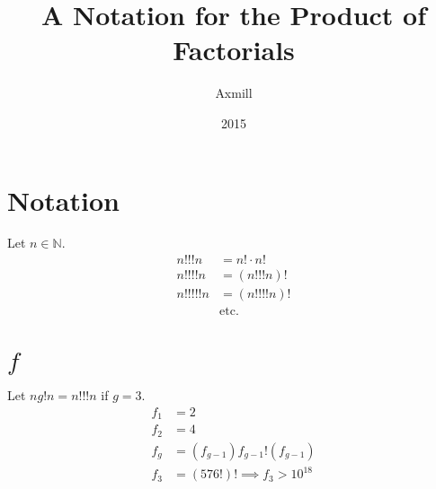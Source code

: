 \documentclass{article}
\title{A Notation for the Product of Factorials}
\author{Axmill}
\date{2015}
\begin{document}
	\maketitle
	\section{Notation}
	Let $n \in \mathbb{N}$.
	\begin{align*}
		n \mathbin{!!!} n &= n! \cdot n!\\
		n \mathbin{!!!!} n &= (n \mathbin{!!!} n)!\\
		n \mathbin{!!!!!} n &= (n \mathbin{!!!!} n)!\\
		&\mathrm{etc.}
	\end{align*}
	\section{$f$}
	Let $n g! n = n \mathbin{!!!} n$ if $g = 3$.
	\begin{align*}
		f_1 &= 2\\
		f_2 &= 4\\
		f_g &= (f_{g - 1}) \mathbin{f_{g - 1}!} (f_{g - 1})\\
		f_3 &= (576!)! \implies f_3 > 10^{18}
	\end{align*}
\end{document}
